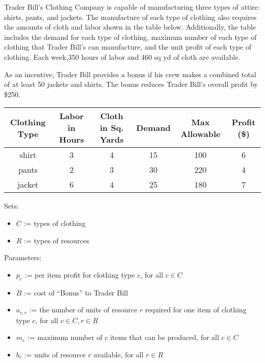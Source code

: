 \documentclass[12pt]{exam}
\begin{document}
\begin{questions}
\begin{parts}
\end{parts}


\newpage

\question Trader Bill's Clothing Company is capable of manufacturing three types of attire: shirts, pants, and jackets. The manufacture of each type of clothing also requires the amounts of cloth and labor shown in the table below. Additionally, the table includes the demand for each type of clothing, maximum number of each type of clothing that Trader Bill's can manufacture, and the unit profit of each type of clothing. Each week,350 hours of labor and 460 sq yd of cloth are available. 

As an incentive, Trader Bill provides a bonus if his crew makes a combined total of at least 50 jackets and shirts.  The bonus reduces Trader Bill's overall profit by \$250.  


\begin{center} \label{table2}

\begin{tabular}{ |c|c|c|c|c|c| } 
    \hline
    Clothing Type & Labor in Hours & Cloth in Sq. Yards & Demand & Max Allowable & Profit (\$) \\ 
    \hline
    shirt & 3 & 4 & 15& 100 & 6 \\
    \hline
    pants & 2 & 3 & 30& 220 & 4 \\
    \hline
    jacket & 6 & 4 & 25& 180 & 7\\
    \hline
\end{tabular}
\end{center}


Sets:
\begin{itemize}
\item $C$ := types of clothing
\item $R$ := types of resources
\end{itemize}

Parameters:
\begin{itemize}
\item  $p_{c}$ := per item profit for clothing type $c$, for all $c \in C$
\item  $B$ := cost of ``Bonus'' to Trader Bill
\item  $a_{c,r}$ := the number of units of resource $r$ required for one item of clothing type $c$, for all $c \in C, r \in R$
\item  $m_{c}$ := maximum number of $c$ items that can be produced, for all $c\in C$
\item  $b_{r}$ := units of resource $r$ available, for all $r \in R$
\end{itemize}


\end{questions}
\end{document}
